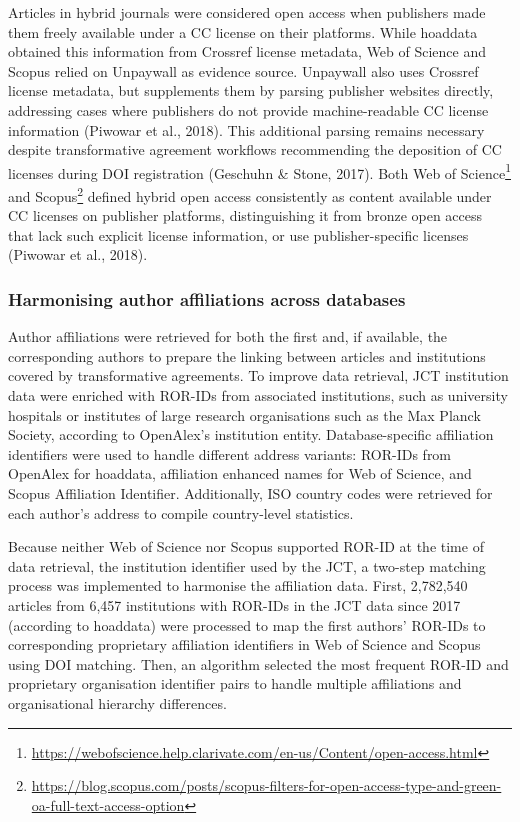 \documentclass[a4paper,man,floatsintext,longtable,noextraspace,10pt]{apa6}
\begin{document}
Articles in hybrid journals were considered open access when publishers
made them freely available under a CC license on their platforms. While
hoaddata obtained this information from Crossref license metadata, Web
of Science and Scopus relied on Unpaywall as evidence source. Unpaywall
also uses Crossref license metadata, but supplements them by parsing
publisher websites directly, addressing cases where publishers do not
provide machine-readable CC license information (Piwowar et al., 2018).
This additional parsing remains necessary despite transformative
agreement workflows recommending the deposition of CC licenses during
DOI registration (Geschuhn \& Stone, 2017). Both Web of
Science\footnote{\url{https://webofscience.help.clarivate.com/en-us/Content/open-access.html}}
and Scopus\footnote{\url{https://blog.scopus.com/posts/scopus-filters-for-open-access-type-and-green-oa-full-text-access-option}}
defined hybrid open access consistently as content available under CC
licenses on publisher platforms, distinguishing it from bronze open
access that lack such explicit license information, or use
publisher-specific licenses (Piwowar et al., 2018).

\subsubsection{Harmonising author affiliations across
databases}\label{harmonising-author-affiliations-across-databases}

Author affiliations were retrieved for both the first and, if available,
the corresponding authors to prepare the linking between articles and
institutions covered by transformative agreements. To improve data
retrieval, JCT institution data were enriched with ROR-IDs from
associated institutions, such as university hospitals or institutes of
large research organisations such as the Max Planck Society, according
to OpenAlex's institution entity. Database-specific affiliation
identifiers were used to handle different address variants: ROR-IDs from
OpenAlex for hoaddata, affiliation enhanced names for Web of Science,
and Scopus Affiliation Identifier. Additionally, ISO country codes were
retrieved for each author's address to compile country-level statistics.

Because neither Web of Science nor Scopus supported ROR-ID at the time
of data retrieval, the institution identifier used by the JCT, a
two-step matching process was implemented to harmonise the affiliation
data. First, 2,782,540 articles from 6,457 institutions with ROR-IDs in
the JCT data since 2017 (according to hoaddata) were processed to map
the first authors' ROR-IDs to corresponding proprietary affiliation
identifiers in Web of Science and Scopus using DOI matching. Then, an
algorithm selected the most frequent ROR-ID and proprietary organisation
identifier pairs to handle multiple affiliations and organisational
hierarchy differences.
\end{document}
